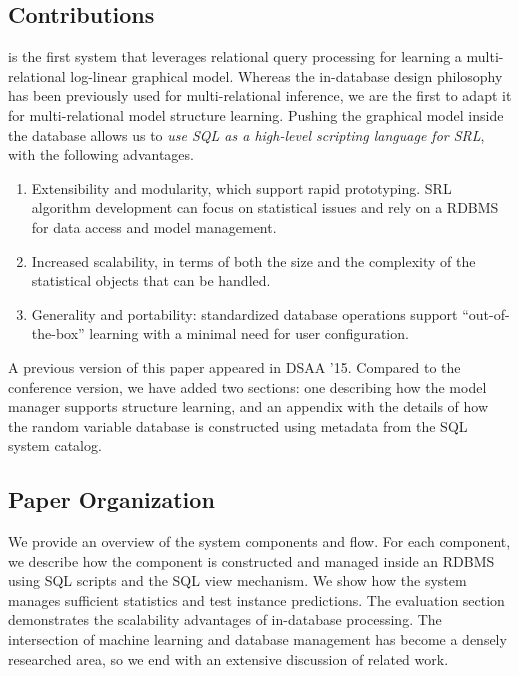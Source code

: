 \subsection{Contributions}
\FB  is the first system that leverages relational query processing for learning a multi-relational log-linear graphical model. Whereas the in-database design philosophy has been previously used for multi-relational inference, we are the first to adapt it for multi-relational model structure learning. Pushing the graphical model inside the database 
allows us to {\em use SQL as a high-level scripting language for SRL}, with the following advantages.

\begin{enumerate}
\item Extensibility and modularity, which support rapid prototyping. SRL algorithm development can focus on statistical issues and rely on a RDBMS for data access and model management.
\item Increased scalability, in terms of both the size and the complexity of the statistical objects that can be handled.
\item Generality and portability: standardized database operations support ``out-of-the-box'' learning with a minimal need for user configuration.
\end{enumerate}

A previous version of this paper appeared in DSAA '15. Compared to the conference version, we have added two sections: one describing how the model manager supports structure learning, and an appendix with the details of how the random variable database is constructed using metadata from the SQL system catalog.

\subsection{Paper Organization}
We provide an overview of the system components and flow. For each component, we describe how the component is constructed and managed inside an RDBMS using SQL scripts and the SQL view mechanism. We show how the system manages sufficient statistics and test instance predictions. The evaluation section demonstrates the scalability advantages of in-database processing. The intersection of machine learning and database management has become a densely researched area, so we end with an extensive discussion of related work. 




